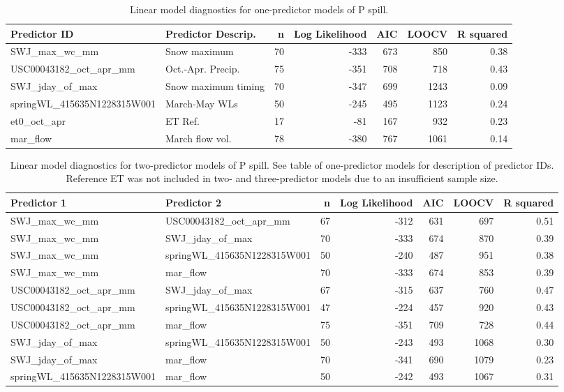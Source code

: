 \documentclass[hess, manuscript]{copernicus}
\begin{document}
\begin{table}[ht]
\centering
\caption{Linear model diagnostics for one-predictor models of P spill.} 
\label{tab:pspill_tab_1pred}
\begin{tabular}{llrrrrr}
  \hline
Predictor ID & Predictor Descrip. & n & Log Likelihood & AIC & LOOCV & R squared \\ 
  \hline
SWJ\_max\_wc\_mm & Snow maximum & 70 & -333 & 673 & 850 & 0.38 \\ 
  USC00043182\_oct\_apr\_mm & Oct.-Apr. Precip. & 75 & -351 & 708 & 718 & 0.43 \\ 
  SWJ\_jday\_of\_max & Snow maximum timing & 70 & -347 & 699 & 1243 & 0.09 \\ 
  springWL\_415635N1228315W001 & March-May WLs & 50 & -245 & 495 & 1123 & 0.24 \\ 
  et0\_oct\_apr & ET Ref. & 17 & -81 & 167 & 932 & 0.23 \\ 
  mar\_flow & March flow vol. & 78 & -380 & 767 & 1061 & 0.14 \\ 
   \hline
\end{tabular}
\end{table}

\begin{table}[ht]
\centering
\caption{Linear model diagnostics for two-predictor models of P spill. See table of one-predictor models for description of predictor IDs. Reference ET was not included in two- and three-predictor models due to an insufficient sample size.} 
\label{tab:pspill_tab_2pred}
\begin{tabular}{llrrrrr}
  \hline
Predictor 1 & Predictor 2 & n & Log Likelihood & AIC & LOOCV & R squared \\ 
  \hline
SWJ\_max\_wc\_mm & USC00043182\_oct\_apr\_mm & 67 & -312 & 631 & 697 & 0.51 \\ 
  SWJ\_max\_wc\_mm & SWJ\_jday\_of\_max & 70 & -333 & 674 & 870 & 0.39 \\ 
  SWJ\_max\_wc\_mm & springWL\_415635N1228315W001 & 50 & -240 & 487 & 951 & 0.38 \\ 
  SWJ\_max\_wc\_mm & mar\_flow & 70 & -333 & 674 & 853 & 0.39 \\ 
  USC00043182\_oct\_apr\_mm & SWJ\_jday\_of\_max & 67 & -315 & 637 & 760 & 0.47 \\ 
  USC00043182\_oct\_apr\_mm & springWL\_415635N1228315W001 & 47 & -224 & 457 & 920 & 0.43 \\ 
  USC00043182\_oct\_apr\_mm & mar\_flow & 75 & -351 & 709 & 728 & 0.44 \\ 
  SWJ\_jday\_of\_max & springWL\_415635N1228315W001 & 50 & -243 & 493 & 1068 & 0.30 \\ 
  SWJ\_jday\_of\_max & mar\_flow & 70 & -341 & 690 & 1079 & 0.23 \\ 
  springWL\_415635N1228315W001 & mar\_flow & 50 & -242 & 493 & 1067 & 0.31 \\ 
   \hline
\end{tabular}
\end{table}
\end{document}
